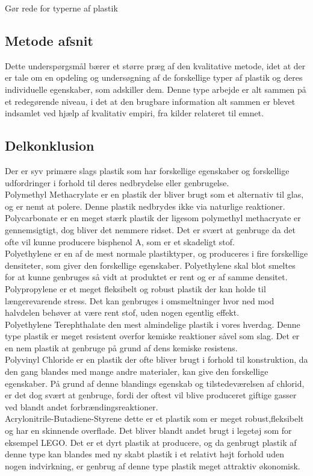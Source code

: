 \documentclass[12pt]{article}
\begin{document}
Gør rede for typerne af plastik

\subsection*{Metode afsnit}

Dette underspørgsmål bærer et større præg af den kvalitative metode, idet at der er tale om en opdeling og undersøgning af de forskellige typer af plastik og deres individuelle egenskaber, som adskiller dem. Denne type arbejde er alt sammen på et redegørende niveau, i det at den brugbare information alt sammen er blevet indsamlet ved hjælp af kvalitativ empiri, fra kilder relateret til emnet.

\subsection*{Delkonklusion}

Der er syv primære slags plastik som har forskellige egenskaber og forskellige udfordringer i forhold til deres nedbrydelse eller genbrugelse.\\
Polymethyl Methacrylate er en plastik der bliver brugt som et alternativ til glas, og er nemt at polere. Denne plastik nedbrydes ikke via naturlige reaktioner.\\
Polycarbonate er en meget stærk plastik der ligesom polymethyl methacryate er gennemsigtigt, dog bliver det nemmere ridset. Det er svært at genbruge da det ofte vil kunne producere bisphenol A, som er et skadeligt stof.\\
Polyethylene er en af de mest normale plastiktyper, og produceres i fire forskellige densiteter, som giver den forskellige egenskaber. Polyethylene skal blot smeltes for at kunne genbruges så vidt at produktet er rent og er af samme densitet.\\
Polypropylene er et meget fleksibelt og robust plastik der kan holde til længerevarende stress. Det kan genbruges i omsmeltninger hvor ned mod halvdelen behøver at være rent stof, uden nogen egentlig effekt.\\
Polyethylene Terephthalate den mest almindelige plastik i vores hverdag. Denne type plastik er meget resistent overfor kemiske reaktioner såvel som slag. Det er en nem plastik at genbruge på grund af dens kemiske resistens.\\
Polyvinyl Chloride er en plastik der ofte bliver brugt i forhold til konstruktion, da den gang blandes med mange andre materialer, kan give den forskellige egenskaber. På grund af denne blandings egenskab og tilstedeværelsen af chlorid, er det dog svært at genbruge, fordi der oftest vil blive produceret giftige gasser ved blandt andet forbrændingsreaktioner.\\
Acrylonitrile-Butadiene-Styrene dette er et plastik som er meget robust,fleksibelt og har en skinnende overflade. Det bliver blandt andet brugt i legetøj som for eksempel LEGO. Det er et dyrt plastik at producere, og da genbrugt plastik af denne type kan blandes med ny skabt plastik i et relativt højt forhold uden nogen indvirkning, er genbrug af denne type plastik meget attraktiv økonomisk.\\
\end{document}
